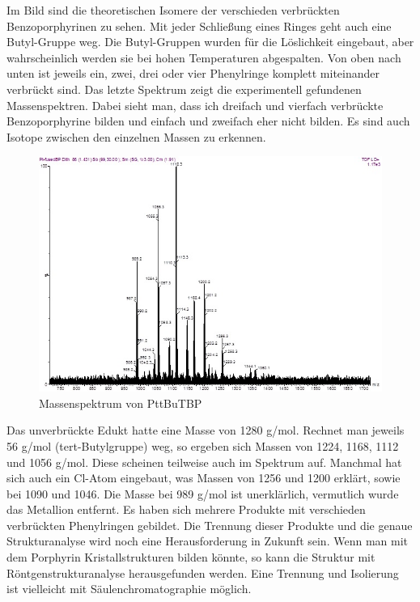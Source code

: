 Im Bild sind die theoretischen Isomere der verschieden verbrückten Benzoporphyrinen zu sehen. Mit jeder Schließung eines Ringes geht auch eine Butyl-Gruppe weg.  Die Butyl-Gruppen wurden für die Löslichkeit eingebaut, aber wahrscheinlich werden sie bei hohen Temperaturen abgespalten. Von oben nach unten ist jeweils ein, zwei, drei oder vier Phenylringe komplett miteinander verbrückt sind. Das letzte Spektrum zeigt die experimentell gefundenen Massenspektren. Dabei sieht man, dass ich dreifach und vierfach verbrückte Benzoporphyrine bilden und einfach und zweifach eher nicht bilden. Es sind auch Isotope zwischen den einzelnen Massen zu erkennen.

\begin{figure}[!htpb]
\centering
\includegraphics[scale=0.9]{graphics/PttBuTBPmassspktrum1}
\caption{Massenspektrum von PttBuTBP}
\end{figure}
Das unverbrückte Edukt hatte eine Masse von 1280 g/mol. Rechnet man jeweils 56 g/mol (tert-Butylgruppe) weg, so ergeben sich Massen von 1224, 1168, 1112 und 1056 g/mol. Diese scheinen teilweise auch im Spektrum auf. Manchmal hat sich auch ein Cl-Atom eingebaut, was Massen von 1256 und 1200 erklärt, sowie bei 1090 und 1046. Die Masse bei 989 g/mol ist unerklärlich, vermutlich wurde das Metallion entfernt.
Es haben sich mehrere Produkte mit verschieden verbrückten Phenylringen gebildet. Die Trennung dieser Produkte und die genaue Strukturanalyse wird noch eine Herausforderung in Zukunft  sein. Wenn man mit dem Porphyrin Kristallstrukturen bilden könnte, so kann die Struktur mit Röntgenstrukturanalyse herausgefunden werden. Eine Trennung und Isolierung ist vielleicht mit Säulenchromatographie möglich.
\newpage
